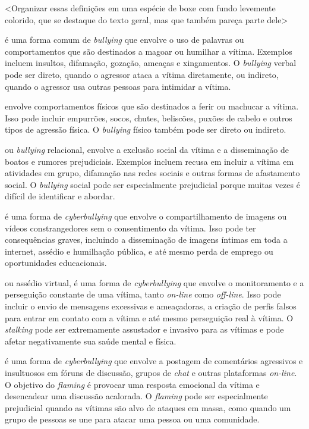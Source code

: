 <Organizar essas definições em uma espécie de boxe com fundo levemente
colorido, que se destaque do texto geral, mas que também pareça parte
dele>

\startitemize[bookmark][color=Orange1,afterhead={\blank[small]}]

é uma forma comum de {\em bullying} que
envolve o uso de palavras ou comportamentos que são destinados a magoar
ou humilhar a vítima. Exemplos incluem insultos, difamação, gozação,
ameaças e xingamentos. O {\em bullying} verbal pode ser direto, quando o
agressor ataca a vítima diretamente, ou indireto, quando o agressor usa
outras pessoas para intimidar a vítima.

 envolve comportamentos físicos que são
destinados a ferir ou machucar a vítima. Isso pode incluir empurrões,
socos, chutes, beliscões, puxões de cabelo e outros tipos de agressão
física. O {\em bullying} físico também pode ser direto ou indireto.

 ou {\em bullying} relacional, envolve a
exclusão social da vítima e a disseminação de boatos e rumores
prejudiciais. Exemplos incluem recusa em incluir a vítima em atividades
em grupo, difamação nas redes sociais e outras formas de afastamento
social. O {\em bullying} social pode ser especialmente prejudicial
porque muitas vezes é difícil de identificar e abordar.

 é uma forma de {\em cyberbullying} que envolve o
compartilhamento de imagens ou vídeos constrangedores sem o
consentimento da vítima. Isso pode ter consequências graves, incluindo a
disseminação de imagens íntimas em toda a internet, assédio e humilhação
pública, e até mesmo perda de emprego ou oportunidades educacionais.

 ou assédio virtual, é uma forma de
{\em cyberbullying} que envolve o monitoramento e a perseguição
constante de uma vítima, tanto {\em on-line} como {\em off-line}. Isso
pode incluir o envio de mensagens excessivas e ameaçadoras, a criação de
perfis falsos para entrar em contato com a vítima e até mesmo
perseguição real à vítima. O {\em stalking} pode ser extremamente
assustador e invasivo para as vítimas e pode afetar negativamente sua
saúde mental e física.

 é uma forma de {\em cyberbullying} que envolve a
postagem de comentários agressivos e insultuosos em fóruns de discussão,
grupos de {\em chat} e outras plataformas {\em on-line}. O objetivo do
{\em flaming} é provocar uma resposta emocional da vítima e desencadear
uma discussão acalorada. O {\em flaming} pode ser especialmente
prejudicial quando as vítimas são alvo de ataques em massa, como quando
um grupo de pessoas se une para atacar uma pessoa ou uma comunidade.

